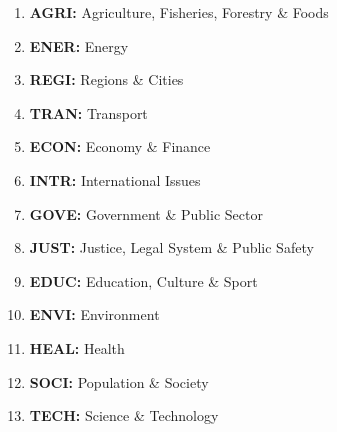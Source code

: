 \documentclass{article}
\theoremstyle{plain}
\theoremstyle{definition}
\begin{document}
\begin{enumerate}
\item \textbf{AGRI:} Agriculture, Fisheries, Forestry \& Foods
\item \textbf{ENER:} Energy
\item \textbf{REGI:} Regions \& Cities
\item \textbf{TRAN:} Transport
\item \textbf{ECON:} Economy \& Finance
\item \textbf{INTR:} International Issues
\item \textbf{GOVE:} Government \& Public Sector
\item \textbf{JUST:} Justice, Legal System \& Public Safety
\item \textbf{EDUC:} Education, Culture \& Sport
\item \textbf{ENVI:} Environment
\item \textbf{HEAL:} Health
\item \textbf{SOCI:} Population \& Society
\item \textbf{TECH:} Science \& Technology
\end{enumerate}
\end{document}
